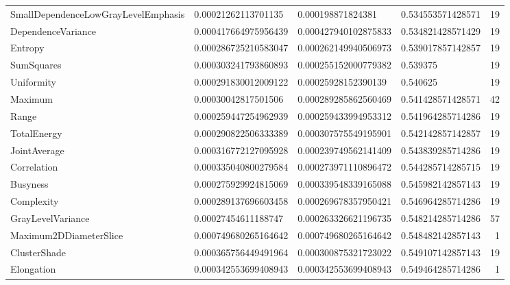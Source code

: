 {\begin{xltabular}[H]{\textwidth}{X l l l r}
    SmallDependenceLowGrayLevelEmphasis    & \num{0.00021262113701135}  & \num{0.000198871824381}    & \num{0.534553571428571} & 19\\
    DependenceVariance                     & \num{0.000417664975956439} & \num{0.000427940102875833} & \num{0.534821428571429} & 19\\
    Entropy                                & \num{0.000286725210583047} & \num{0.000262149940506973} & \num{0.539017857142857} & 19\\
    SumSquares                             & \num{0.000303241793860893} & \num{0.000255152000779382} & \num{0.539375} & 19\\
    Uniformity                             & \num{0.000291830012009122} & \num{0.00025928152390139}  & \num{0.540625} & 19\\
    Maximum                                & \num{0.00030042817501506}  & \num{0.000289285862560469} & \num{0.541428571428571} & 42\\
    Range                                  & \num{0.000259447254962939} & \num{0.000259433994953312} & \num{0.541964285714286} & 19\\
    TotalEnergy                            & \num{0.000290822506333389} & \num{0.000307575549195901} & \num{0.542142857142857} & 19\\
    JointAverage                           & \num{0.000316772127095928} & \num{0.000239749562141409} & \num{0.543839285714286} & 19\\
    Correlation                            & \num{0.000335040800279584} & \num{0.000273971110896472} & \num{0.544285714285715} & 19\\
    Busyness                               & \num{0.000275929924815069} & \num{0.000339548339165088} & \num{0.545982142857143} & 19\\
    Complexity                             & \num{0.000289137696603458} & \num{0.000269678357950421} & \num{0.546964285714286} & 19\\
    GrayLevelVariance                      & \num{0.00027454611188747}  & \num{0.000263326621196735} & \num{0.548214285714286} & 57\\
    Maximum2DDiameterSlice                 & \num{0.000749680265164642} & \num{0.000749680265164642} & \num{0.548482142857143} & 1\\
    ClusterShade                           & \num{0.000365756449491964} & \num{0.000300875321723022} & \num{0.549107142857143} & 19\\
    Elongation                             & \num{0.000342553699408943} & \num{0.000342553699408943} & \num{0.549464285714286} & 1\\

\end{xltabular}}
